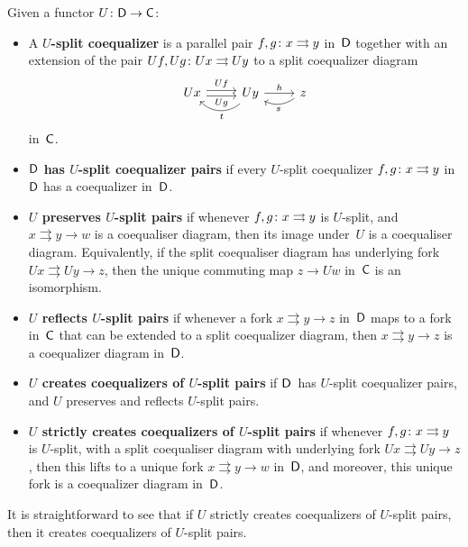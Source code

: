 \documentclass[../../solutions]{subfiles}
\begin{document}
\begin{definition}
  Given a functor ${U}\colon{{\mathsf{D}}}\to{{\mathsf{C}}}$:
  \begin{itemize}
  \item A \textbf{$U$-split coequalizer} is a parallel pair
    ${f,g}\colon{x}\rightrightarrows{y}$ in~${\mathsf{D}}$ together with an extension of the
    pair ${Uf,Ug}\colon{Ux}\rightrightarrows{Uy}$ to a split coequalizer diagram
    $$
    \begin{tikzcd}
      Ux
      \ar[r, shift left=0.5ex, "Uf"]
      \ar[r, shift right=0.5ex, "Ug"']
      & Uy \ar[r, "h"]
      \ar[l, bend left=45, pos=0.45, "t"]
      & z
      \ar[l, bend left, pos=0.55, "s"]
    \end{tikzcd}
    $$
    in~${\mathsf{C}}$.
  \item \textbf{${\mathsf{D}}$ has $U$-split coequalizer pairs} if every
    $U$-split coequalizer ${f,g}\colon{x}\rightrightarrows{y}$ in~${\mathsf{D}}$ has a
    coequalizer in~${\mathsf{D}}$.
  \item \textbf{$U$ preserves $U$-split pairs} if whenever
    ${f,g}\colon{x}\rightrightarrows{y}$ is $U$-split, and $x\rightrightarrows y\to w$
    is a coequaliser diagram, then its image under~$U$ is a
    coequaliser diagram.  Equivalently, if the split coequaliser
    diagram has underlying fork $Ux\rightrightarrows Uy\to z$, then
    the unique commuting map $z\to Uw$ in~${\mathsf{C}}$ is an isomorphism.
  \item \textbf{$U$ reflects $U$-split pairs} if whenever a fork
    $x\rightrightarrows y\to z$ in~${\mathsf{D}}$ maps to a fork in~${\mathsf{C}}$ that
    can be extended to a split coequalizer diagram, then
    $x\rightrightarrows y\to z$ is a coequalizer diagram in~${\mathsf{D}}$.
  \item \textbf{$U$ creates coequalizers of $U$-split pairs} if
    ${\mathsf{D}}$~has $U$-split coequalizer pairs, and $U$ preserves and
    reflects $U$-split pairs.
  \item \textbf{$U$ strictly creates coequalizers of $U$-split pairs}
    if whenever ${f,g}\colon{x}\rightrightarrows{y}$ is $U$-split, with a split
    coequaliser diagram with underlying fork
    $Ux\rightrightarrows Uy\to z$, then this lifts to a unique fork
    $x\rightrightarrows y\to w$ in~${\mathsf{D}}$, and moreover, this unique
    fork is a coequalizer diagram in~${\mathsf{D}}$.
  \end{itemize}
\end{definition}

It is straightforward to see that if $U$ strictly creates coequalizers
of $U$-split pairs, then it creates coequalizers of $U$-split pairs.
\end{document}
